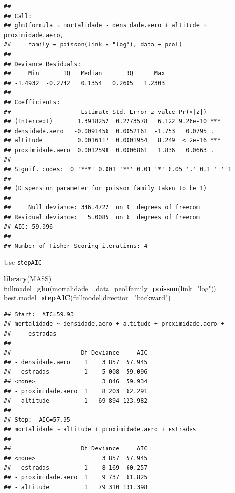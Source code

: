 \documentclass[
]{book}
\newenvironment{Shaded}{\begin{snugshade}}{\end{snugshade}}
\newcommand{\DataTypeTok}[1]{\textcolor[rgb]{0.13,0.29,0.53}{#1}}
\newcommand{\KeywordTok}[1]{\textcolor[rgb]{0.13,0.29,0.53}{\textbf{#1}}}
\newcommand{\NormalTok}[1]{#1}
\newcommand{\OperatorTok}[1]{\textcolor[rgb]{0.81,0.36,0.00}{\textbf{#1}}}
\newcommand{\StringTok}[1]{\textcolor[rgb]{0.31,0.60,0.02}{#1}}
\begin{document}
\begin{verbatim}
## 
## Call:
## glm(formula = mortalidade ~ densidade.aero + altitude + proximidade.aero, 
##     family = poisson(link = "log"), data = peol)
## 
## Deviance Residuals: 
##     Min       1Q   Median       3Q      Max  
## -1.4932  -0.2742   0.1354   0.2605   1.2303  
## 
## Coefficients:
##                    Estimate Std. Error z value Pr(>|z|)    
## (Intercept)       1.3918252  0.2273578   6.122 9.26e-10 ***
## densidade.aero   -0.0091456  0.0052161  -1.753   0.0795 .  
## altitude          0.0016117  0.0001954   8.249  < 2e-16 ***
## proximidade.aero  0.0012598  0.0006861   1.836   0.0663 .  
## ---
## Signif. codes:  0 '***' 0.001 '**' 0.01 '*' 0.05 '.' 0.1 ' ' 1
## 
## (Dispersion parameter for poisson family taken to be 1)
## 
##     Null deviance: 346.4722  on 9  degrees of freedom
## Residual deviance:   5.0085  on 6  degrees of freedom
## AIC: 59.096
## 
## Number of Fisher Scoring iterations: 4
\end{verbatim}

Use \texttt{stepAIC}

\begin{Shaded}
\begin{Highlighting}[]
\KeywordTok{library}\NormalTok{(MASS)}
\NormalTok{fullmodel=}\KeywordTok{glm}\NormalTok{(mortalidade}\OperatorTok{~}\NormalTok{.,}\DataTypeTok{data=}\NormalTok{peol,}\DataTypeTok{family=}\KeywordTok{poisson}\NormalTok{(}\DataTypeTok{link=}\StringTok{"log"}\NormalTok{))}
\NormalTok{best.model=}\KeywordTok{stepAIC}\NormalTok{(fullmodel,}\DataTypeTok{direction=}\StringTok{"backward"}\NormalTok{)}
\end{Highlighting}
\end{Shaded}

\begin{verbatim}
## Start:  AIC=59.93
## mortalidade ~ densidade.aero + altitude + proximidade.aero + 
##     estradas
## 
##                    Df Deviance     AIC
## - densidade.aero    1    3.857  57.945
## - estradas          1    5.008  59.096
## <none>                   3.846  59.934
## - proximidade.aero  1    8.203  62.291
## - altitude          1   69.894 123.982
## 
## Step:  AIC=57.95
## mortalidade ~ altitude + proximidade.aero + estradas
## 
##                    Df Deviance     AIC
## <none>                   3.857  57.945
## - estradas          1    8.169  60.257
## - proximidade.aero  1    9.737  61.825
## - altitude          1   79.310 131.398
\end{verbatim}
\end{document}
